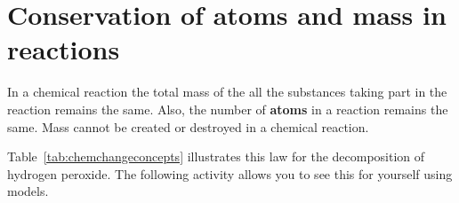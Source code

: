     \label{m38711*cid5}
            \section{Conservation of atoms and mass in reactions}
            \nopagebreak
      \label{m38711*id64489}In a chemical reaction the total mass of the all the substances taking part in the reaction remains the same. Also, the number of \textbf{atoms} in a reaction remains the same. Mass cannot be created or destroyed in a chemical reaction.\par 
{}
Table~\ref{tab:chemchangeconcepts} illustrates this law for the decomposition of hydrogen peroxide. The following activity allows you to see this for yourself using models.

